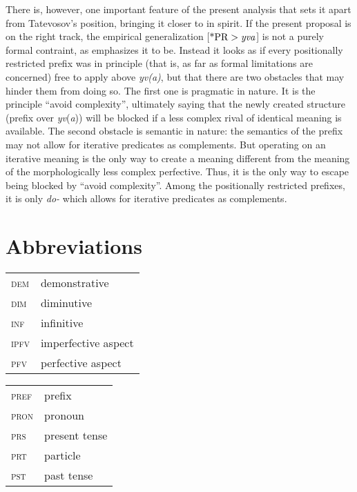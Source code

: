 \documentclass[output=paper,
colorlinks,
citecolor=brown,
newtxmath
]{langscibook}
\begin{document}
There is, however, one important feature of the present analysis that sets it apart from Tatevosov's position, bringing it closer to \citet{Zinova2016} in spirit. If the present proposal is on the right track, the empirical generalization [$\text{*PR}>\text{\textit{yva}}$] is not a purely formal contraint, as \citet{Tatevosov2013b} emphasizes it to be. Instead it looks as if every positionally restricted prefix was in principle (that is, as far as formal limitations are concerned) free to apply above \textit{yv(a)}, but that there are two obstacles that may hinder them from doing so. The first one is pragmatic in nature. It is the principle ``avoid complexity'', ultimately saying that the newly created structure (prefix over \textit{yv}(\textit{a})) will be blocked if a less complex rival of identical meaning is available. The second obstacle is semantic in nature: the semantics of the prefix may not allow for iterative predicates as complements. But operating on an iterative meaning is the only way to create a meaning different from the meaning of the morphologically less complex perfective. Thus, it is the only way to escape being blocked by ``avoid complexity''.
Among the positionally restricted prefixes, it is only \textit{do-} which allows for iterative predicates as complements.


\section*{Abbreviations}

\begin{tabularx}{.5\textwidth}{@{}lQ}
\textsc{dem} & demonstrative\\
\textsc{dim} & diminutive\\
\textsc{inf} & infinitive\\
\textsc{ipfv} & imperfective aspect\\
\textsc{pfv} & perfective aspect\\
\end{tabularx}%
\begin{tabularx}{.5\textwidth}{lQ@{}}
\textsc{pref} & prefix\\
\textsc{pron} & pronoun\\
\textsc{prs} & present tense\\
\textsc{prt} & particle\\
\textsc{pst} & past tense\\
\end{tabularx}
\end{document}
